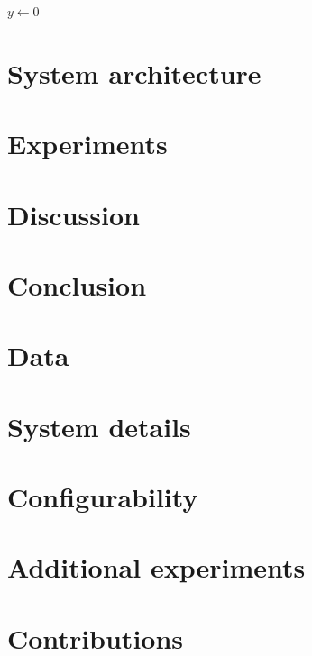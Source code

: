 \documentclass{midl} %
\begin{document}
\begin{algorithm2e}
\caption{Computing Net Activation}
\label{alg:net}
{}
$y\leftarrow 0$\;
\end{algorithm2e}

\section{System architecture}

\section{Experiments}

\section{Discussion}

\section{Conclusion}



\appendix

\section{Data}

\section{System details}


\section{Configurability}

\section{Additional experiments}

\section{Contributions}
\end{document}
